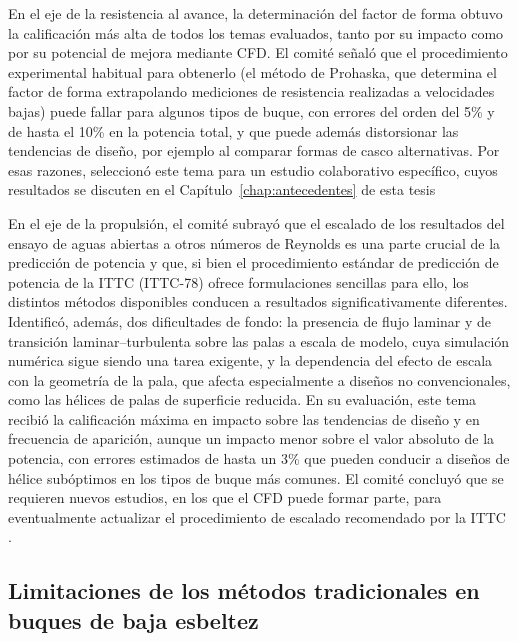 En el eje de la resistencia al avance, la determinación del factor de forma
obtuvo la calificación más alta de todos los temas evaluados, tanto por su
impacto como por su potencial de mejora mediante CFD. El comité señaló que el
procedimiento experimental habitual para obtenerlo (el método de Prohaska,
que determina el factor de forma extrapolando mediciones de resistencia
realizadas a velocidades bajas) puede fallar para algunos tipos de buque, con errores del orden del 5\% y de
hasta el 10\% en la potencia total, y que puede además distorsionar las
tendencias de diseño, por ejemplo al comparar formas de casco alternativas.
Por esas razones, seleccionó este tema para un estudio colaborativo
específico, cuyos resultados se discuten en el
Capítulo~\ref{chap:antecedentes} de esta tesis

En el eje de la propulsión, el comité subrayó que el escalado de los
resultados del ensayo de aguas abiertas a otros números de Reynolds es una
parte crucial de la predicción de potencia y que, si bien el procedimiento
estándar de predicción de potencia de la ITTC (ITTC-78) ofrece formulaciones
sencillas para ello, los distintos métodos
disponibles conducen a resultados significativamente diferentes. Identificó,
además, dos dificultades de fondo: la presencia de flujo laminar y de
transición laminar--turbulenta sobre las palas a escala de modelo, cuya
simulación numérica sigue siendo una tarea exigente, y la dependencia del
efecto de escala con la geometría de la pala, que afecta especialmente a
diseños no convencionales, como las hélices de palas de superficie reducida. En su
evaluación, este tema recibió la calificación máxima en impacto sobre las
tendencias de diseño y en frecuencia de aparición, aunque un impacto menor
sobre el valor absoluto de la potencia, con errores estimados de hasta un
3\% que pueden conducir a diseños de hélice subóptimos en los tipos de buque
más comunes. El comité concluyó que se requieren nuevos estudios, en los que
el CFD puede formar parte, para eventualmente actualizar el procedimiento de
escalado recomendado por la ITTC \citep{ITTC_Combined_2021}.

\subsection{Limitaciones de los métodos tradicionales en buques de baja esbeltez}

